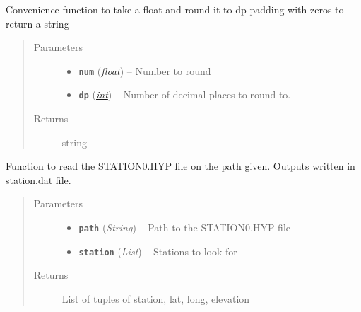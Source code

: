 \documentclass[a4paper,10pt,english]{sphinxmanual}
\begin{document}
\begin{fulllineitems}
\label{submodules/utils.catalogue2DD:catalogue2DD._cc_round}
Convenience function to take a float and round it to dp padding with zeros
to return a string
\begin{quote}\begin{description}
\item[{Parameters}] \leavevmode\begin{itemize}
\item {} 
\textbf{\texttt{num}} (\href{https://docs.python.org/library/functions.html\#float}{\emph{float}}) -- Number to round

\item {} 
\textbf{\texttt{dp}} (\href{https://docs.python.org/library/functions.html\#int}{\emph{int}}) -- Number of decimal places to round to.

\end{itemize}

\item[{Returns}] \leavevmode
string

\end{description}\end{quote}

\end{fulllineitems}


\begin{fulllineitems}
\label{submodules/utils.catalogue2DD:catalogue2DD.readSTATION0}
Function to read the STATION0.HYP file on the path given.  Outputs written
in station.dat file.
\begin{quote}\begin{description}
\item[{Parameters}] \leavevmode\begin{itemize}
\item {} 
\textbf{\texttt{path}} (\emph{String}) -- Path to the STATION0.HYP file

\item {} 
\textbf{\texttt{station}} (\emph{List}) -- Stations to look for

\end{itemize}

\item[{Returns}] \leavevmode
List of tuples of station, lat, long, elevation

\end{description}\end{quote}

\end{fulllineitems}
\end{document}
